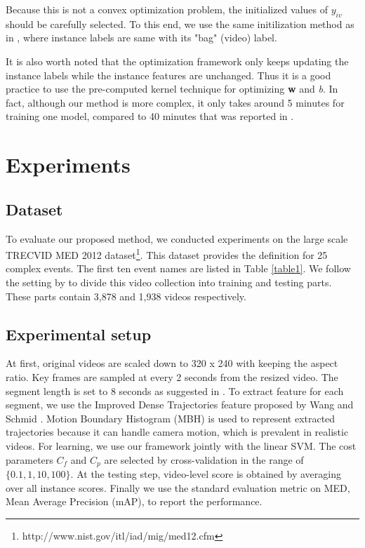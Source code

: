 Because this is not a convex optimization problem, the initialized values of $y_{iv}$ should be carefully selected. To this end, we use the same initilization method as in \cite{andrews2002support,lai2014video}, where instance labels are same with its "bag" (video) label. 

It is also worth noted that the optimization framework only keeps updating the instance labels while the instance features are unchanged. Thus it is a good practice to use the pre-computed kernel technique for optimizing \textbf{w} and \textit{b}. In fact, although our method is more complex, it only takes around 5 minutes for training one model, compared to 40 minutes that was reported in \cite{lai2014video}. 
\section{Experiments}
\subsection{Dataset} To evaluate our proposed method, we conducted experiments on the large scale TRECVID MED 2012 dataset\footnote{http://www.nist.gov/itl/iad/mig/med12.cfm}. This dataset provides the definition for 25 complex events. The first ten event names are listed in Table \ref{table1}. We follow the setting by \cite{lai2014video} to divide this video collection into training and testing parts. These parts contain 3,878 and 1,938 videos respectively.

\subsection{Experimental setup} At first, original videos are scaled down to 320 x 240 with keeping the aspect ratio. Key frames are sampled at every 2 seconds from the resized video. The segment length is set to 8 seconds as suggested in \cite{vahdat2013compositional}. To extract feature for each segment, we use the Improved Dense Trajectories feature proposed by Wang and Schmid \cite{Wang2013}. Motion Boundary Histogram (MBH) is used to represent extracted trajectories because it can handle camera motion, which is prevalent in realistic videos. For learning, we use our framework jointly with the linear SVM. The cost parameters $C_{f}$ and $C_{p}$ are selected by cross-validation in the range of $\{0.1, 1, 10, 100\}$. At the testing step, video-level score is obtained by averaging over all instance scores. Finally we use the standard evaluation metric on MED, Mean Average Precision (mAP), to report the performance.

